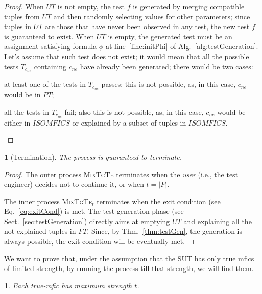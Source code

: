 \documentclass[
12pt, %
oneside, %
english, %
singlespacing, %
headsepline, %
consistentlayout, %
]{MastersDoctoralThesis} %
\newcommand{\mix}{\textsc{MixTgTe}\xspace}
\newcommand{\mixt}{\textsc{MixTgTe$_t$}\xspace}
\newcommand{\mfic}{\textsf{mfic}\xspace}
\newcommand{\mfics}{\textsf{mfics}\xspace}
\newcommand{\ft}{\ensuremath{\mathit{FT}}\xspace}
\newcommand{\ut}{\ensuremath{\mathit{UT}}\xspace}
\newcommand{\pt}{\ensuremath{\mathit{PT}}\xspace}
\newcommand{\isoMficsSet}{\ensuremath{\mathit{ISOMFICS}}\xspace}
\newtheorem{thm}{\protect\theoremname}
\providecommand{\theoremname}{Theorem}
\theoremstyle{plain}
\theoremstyle{definition}
\theoremstyle{remark}
\theoremstyle{plain}
\newtheorem{assumption}{\protect\assumptionname}
\theoremstyle{plain}
\providecommand{\theoremname}{Theorem}
\providecommand{\assumptionname}{Assumption}
\theoremstyle{remark}
\begin{document}
\begin{proof}
	When \ut is not empty, the test $f$ is generated by merging compatible tuples from \ut and then randomly selecting values for other parameters; since tuples in \ut are those that have never been observed in any test, the new test $f$ is guaranteed to exist. When \ut is empty, the generated test must be an assignment satisfying formula $\phi$ at line~\ref{line:initPhi} of Alg.~\ref{alg:testGeneration}. Let's assume that such test does not exist; it would mean that all the possible tests $T_{c_{\mathit{ne}}}$ containing $c_{\mathit{ne}}$ have already been generated; there would be two cases:
	\begin{compactitem}
		\item at least one of the tests in $T_{c_{\mathit{ne}}}$ passes; this is not possible, as, in this case, $c_{\mathit{ne}}$ would be in \pt;
		\item all the tests in $T_{c_{\mathit{ne}}}$ fail; also this is not possible, as, in this case, $c_{\mathit{ne}}$ would be either in \isoMficsSet or explained by a subset of tuples in \isoMficsSet.%
	\end{compactitem}
\end{proof}

\begin{thm}[Termination]\label{thm:termination}
	The process is guaranteed to terminate.
\end{thm}

\begin{proof}
	The outer process \mix terminates when the \textit{user} (i.e., the test engineer) decides not to continue it, or when $t=\vert P \vert$.
	
	The inner process \mixt terminates when the exit condition (see Eq.~\ref{eq:exitCond}) is met. The test generation phase (see Sect.~\ref{sec:testGeneration}) directly aims at emptying \ut and explaining all the not explained tuples in \ft. Since, by Thm.~\ref{thm:testGen}, the generation is always possible, the exit condition will be eventually met.
\end{proof}

We want to prove that, under the assumption that the SUT has only true \mfics of limited strength, by running the process till that strength, we will find them.

\begin{assumption}\label{assu:maxStrength}
	Each true-\mfic has maximum strength $t$.
\end{assumption}
\end{document}
